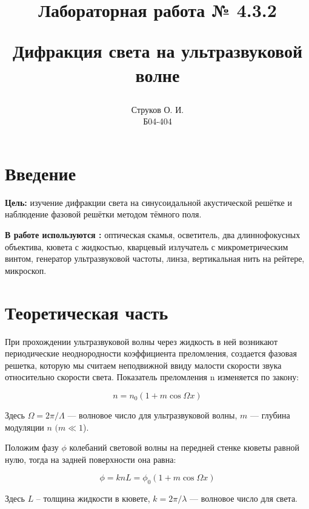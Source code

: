 \documentclass[12pt, a4paper]{article}
\begin{document}
\title{\begin{center}Лабораторная работа № 4.3.2\end{center}
Дифракция света на ультразвуковой волне}
\author{Струков О. И. \\ Б04-404}
\date{}

\thispagestyle{empty}
\maketitle
\newpage
{}

\section*{Введение}
\textbf{Цель:} изучение дифракции света на синусоидальной акустической решётке и наблюдение фазовой решётки методом тёмного
поля.

\textbf{В работе используются :} оптическая скамья, осветитель, два длиннофокусных объектива, кювета с жидкостью, кварцевый излучатель
с микрометрическим винтом, генератор ультразвуковой частоты, линза, вертикальная нить на рейтере, микроскоп.

\section*{Теоретическая часть}
При прохождении ультразвуковой волны через жидкость в ней возникают периодические неоднородности коэффициента преломления, создается фазовая решетка, которую мы считаем неподвижной ввиду малости скорости звука относительно скорости света. Показатель
	преломления n изменяется по закону:
	
	\begin{equation}\label{}
	n = n_0 (1 + m \cos \Omega x)
	\end{equation}
	
	Здесь $ \Omega = 2 \pi / \Lambda $ --- волновое число для ультразвуковой волны, $ m $ --- глубина модуляции $ n $ $ (m \ll 1 $).
	
	Положим фазу $ \phi $ колебаний световой волны на передней стенке кюветы равной нулю, тогда на задней поверхности она равна:
	
	\begin{equation}\label{}
	\phi  = k n L = \phi_0 (1 + m \cos \Omega x)
	\end{equation}
	
	Здесь $ L $ -- толщина жидкости в кювете, $ k = 2 \pi / \lambda $ --- волновое число для света.
	
\end{document}
